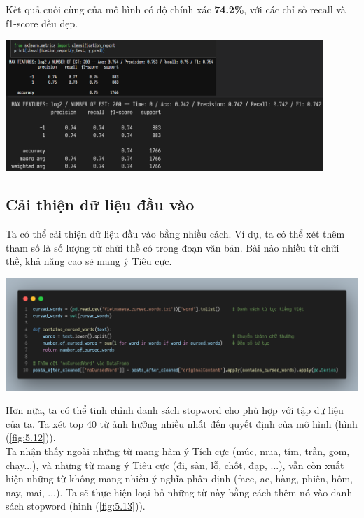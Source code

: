 Kết quả cuối cùng của mô hình có độ chính xác \textbf{74.2\%}, với các chỉ số recall và f1-score đều đẹp.

\begin{center}
\includegraphics[width=0.9\textwidth]{images/code-5.13-rftest.png}
\end{center}

\subsection{Cải thiện dữ liệu đầu vào}
Ta có thể cải thiện dữ liệu đầu vào bằng nhiều cách. Ví dụ, ta có thể xét thêm tham số là số lượng từ chửi thề có trong đoạn văn bản. Bài nào nhiều từ chửi thề, khả năng cao sẽ mang ý Tiêu cực.

\begin{center}
\includegraphics[width=1\textwidth]{images/code-5.14-cw.png}
\end{center}

Hơn nữa, ta có thể tinh chỉnh danh sách stopword cho phù hợp với tập dữ liệu của ta. Ta xét top 40 từ ảnh hưởng nhiều nhất đến quyết định của mô hình (hình (\ref{fig:5.12})).\\

Ta nhận thấy ngoài những từ mang hàm ý Tích cực (múc, mua, tím, trần, gom, chạy...), và những từ mang ý Tiêu cực (đi, sàn, lỗ, chốt, đạp, ...), vẫn còn xuất hiện những từ không mang nhiều ý nghĩa phân định (face, ae, hàng, phiên, hôm, nay, mai, ...). Ta sẽ thực hiện loại bỏ những từ này bằng cách thêm nó vào danh sách stopword (hình (\ref{fig:5.13})).\\

